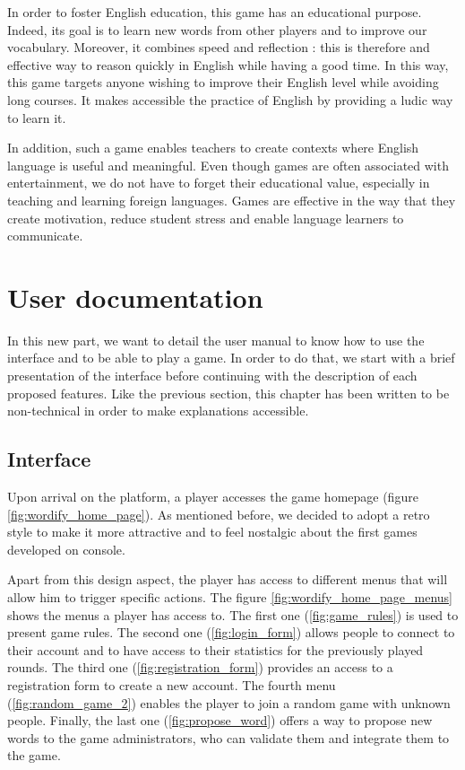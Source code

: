 \documentclass{tnreport}
\begin{document}
In order to foster English education, this game has an educational purpose. Indeed, its goal is to learn new words from other players and to improve our vocabulary. Moreover, it combines speed and reflection : this is therefore and effective way to reason quickly in English while having a good time. In this way, this game targets anyone wishing to improve their English level while avoiding long courses. It makes accessible the practice of English by providing a ludic way to learn it. 

In addition, such a game enables teachers to create contexts where English language is useful and meaningful. Even though games are often associated with entertainment, we do not have to forget their educational value, especially in teaching and learning foreign languages. Games are effective in the way that they create motivation, reduce student stress and enable language learners to communicate.

\cleardoublepage

\chapter{User documentation}

In this new part, we want to detail the user manual to know how to use the interface and to be able to play a game. In order to do that, we start with a brief presentation of the interface before continuing with the description of each proposed features. Like the previous section, this chapter has been written to be non-technical in order to make explanations accessible. 

\section{Interface}

Upon arrival on the platform, a player accesses the game homepage (figure \ref{fig:wordify_home_page}). As mentioned before, we decided to adopt a retro style to make it more attractive and to feel nostalgic about the first games developed on console. 

Apart from this design aspect, the player has access to different menus that will allow him to trigger specific actions. The figure \ref{fig:wordify_home_page_menus} shows the menus a player has access to.  The first one (\ref{fig:game_rules}) is used to present game rules. The second one (\ref{fig:login_form}) allows people to connect to their account and to have access to their statistics for the previously played rounds. The third one (\ref{fig:registration_form}) provides an access to a registration form to create a new account. The fourth menu (\ref{fig:random_game_2}) enables the player to join a random game with unknown people. Finally, the last one (\ref{fig:propose_word}) offers a way to propose new words to the game administrators, who can validate them and integrate them to the game. 
\end{document}

